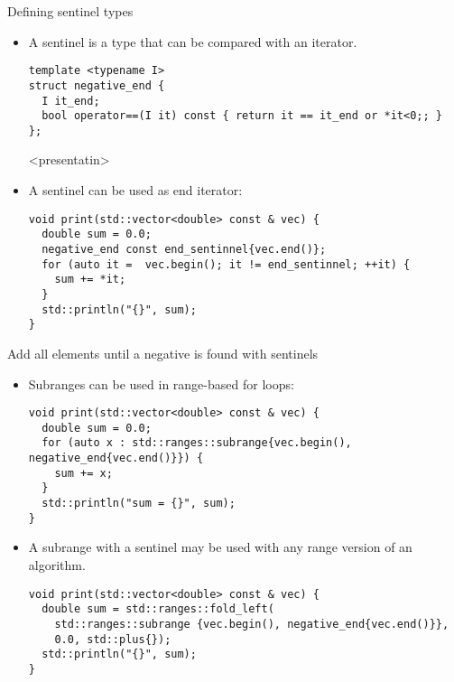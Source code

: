 \begin{frame}[t,fragile]{Defining sentinel types}
\begin{itemize}
  \item A sentinel is a type that can be compared with an iterator.
\begin{lstlisting}
template <typename I>
struct negative_end {
  I it_end;
  bool operator==(I it) const { return it == it_end or *it<0;; }
};
\end{lstlisting}

  \mode<presentatin>{\vfill\pause}
  \item A sentinel can be used as end iterator:
\begin{lstlisting}
void print(std::vector<double> const & vec) {
  double sum = 0.0;
  negative_end const end_sentinnel{vec.end()};
  for (auto it =  vec.begin(); it != end_sentinnel; ++it) {
    sum += *it;
  }
  std::println("{}", sum);
}
\end{lstlisting}
\end{itemize}
\end{frame}

\begin{frame}[t,fragile]{Add all elements until a negative is found with
sentinels}
\begin{itemize}
  \item Subranges can be used in range-based for loops:
\begin{lstlisting}
void print(std::vector<double> const & vec) {
  double sum = 0.0;
  for (auto x : std::ranges::subrange{vec.begin(), negative_end{vec.end()}}) {
    sum += x;
  }
  std::println("sum = {}", sum);
}
\end{lstlisting}

  \item A subrange with a sentinel may be used with any range version of an
        algorithm.

\begin{lstlisting}
void print(std::vector<double> const & vec) {
  double sum = std::ranges::fold_left(
    std::ranges::subrange {vec.begin(), negative_end{vec.end()}},
    0.0, std::plus{});
  std::println("{}", sum);
}
\end{lstlisting}
\end{itemize}
\end{frame}

